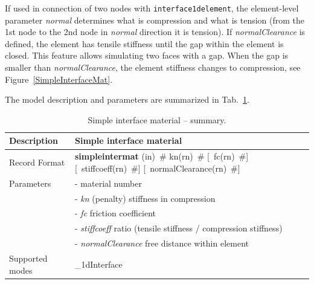 \documentclass[a4paper]{article}
\newcommand{\descitem}[1]{{\noindent \bf #1}}
\newcommand{\elemparam}[2]{{{#1\tiny (#2)}~\#}}
\newcommand{\optelemparam}[2]{[{~\elemparam{#1}{#2}}]}
\newcommand{\param}[1]{{\it #1}}
\newenvironment{mmt}{\begin{tabular}{|l|p{9cm}|}}{\end{tabular}\\}
\newenvironment{mmt}{\begin{tabular}{|l|l|}}{\end{tabular}\\}
\begin{document}
If used in connection of two nodes with {\tt interface1delement}, the element-level parameter \param{normal} determines what is compression and what is tension (from the 1st node to the 2nd node in \param{normal} direction it is tension). If \param{normalClearance} is defined, the element has tensile stiffness until the gap within the element is closed. This feature allows simulating two faces with a gap. When the gap is smaller than \param{normalClearance}, the element stiffness changes to compression, see Figure~\ref{SimpleInterfaceMat}. 

The model description and parameters are summarized in Tab.~\ref{simpleinterfacemat_table}.

\begin{table}[!htb]
\begin{mmt}
\hline
Description & Simple interface material\\
\hline
Record Format & \descitem{simpleintermat}  \elemparam{}{in}
\elemparam{kn}{rn} \optelemparam{fc}{rn} \optelemparam{stiffcoeff}{rn} \optelemparam{normalClearance}{rn}\\
Parameters &- \param{} material number\\
&- \param{kn} (penalty) stiffness in compression\\
&- \param{fc} friction coefficient\\
&- \param{stiffcoeff} ratio (tensile stiffness / compression stiffness)\\
&- \param{normalClearance} free distance within element\\

Supported modes& \_1dInterface\\
\hline
\end{mmt}
\caption{Simple interface material -- summary.}
\label{simpleinterfacemat_table}
\end{table}
\end{document}
